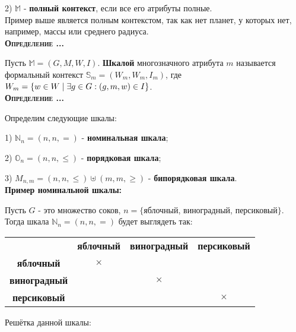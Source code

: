 \documentclass[18pt, a4paper]{extarticle}
\newcounter{par}
\newcounter{spar}
\newcounter{zap}
\newcommand{\opr}{\textbf{\textsc{Определение \thepar.\if\thespar1\thespar.\fi\thezap.\;}}\stepcounter{zap}}
\newcommand{\primerT}[1]{\textbf{Пример #1:\;}}
\begin{document}
2) $\mathbb{M}$ - \textbf{полный контекст}, если все его атрибуты полные.\\

Пример выше является полным контекстом, так как нет планет, у которых нет, например, массы или среднего радиуса.\\

\opr

Пусть $\mathbb{M}=(G,M,W,I)$. \textbf{Шкалой} многозначного атрибута $m$ называется формальный контекст $\mathbb{S}_m=(W_m,W_m,I_m)$, где $W_m=\{w\in W\;|\;\exists g\in G:\newline(g,m,w)\in I\}$.\\

\opr

Определим следующие шкалы:

1) $\mathbb{N}_n=(n,n,=)$ - \textbf{номинальная шкала};

2) $\mathbb{O}_n=(n,n,\le)$ - \textbf{порядковая шкала};

3) $M_{n,m}=(n,n,\le)\uplus(m,m,\ge)$ - \textbf{бипорядковая шкала}.\\

\primerT{номинальной шкалы}

Пусть $G$ - это множество соков, $n=\{$яблочный, виноградный, персиковый$\}$. Тогда шкала $\mathbb{N}_n=(n,n,=)$ будет выглядеть так:

\begin{center}
\scalebox{.8}
{
\begin{tabular}{|c|c|c|c|}
\cline{1-4}
& \textbf{яблочный} & \textbf{виноградный} & \textbf{персиковый} \\
\cline{1-4}
\textbf{яблочный} & $\times$ & & \\
\cline{1-4}
\textbf{виноградный} & & $\times$ & \\
\cline{1-4}
\textbf{персиковый} & & & $\times$ \\
\cline{1-4}
\end{tabular}
}
\end{center}\newpage

Решётка данной шкалы:

\begin{center}
\end{center}
\end{document}
